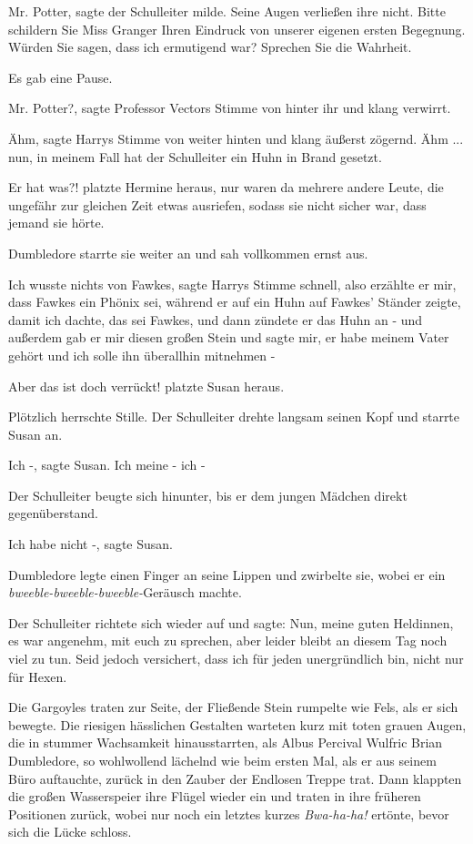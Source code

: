 \glqq{}Mr. Potter\grqq{}, sagte der Schulleiter milde. Seine Augen verließen ihre
nicht. \glqq{}Bitte schildern Sie Miss Granger Ihren Eindruck von unserer eigenen
ersten Begegnung. Würden Sie sagen, dass ich ermutigend war? Sprechen Sie die
Wahrheit.\grqq{}

Es gab eine Pause.

\glqq{}Mr. Potter?\grqq{}, sagte Professor Vectors Stimme von hinter ihr und
klang verwirrt.

\glqq{}Ähm\grqq{}, sagte Harrys Stimme von weiter hinten und klang äußerst
zögernd. \glqq{}Ähm ... nun, in meinem Fall hat der Schulleiter ein Huhn in Brand
gesetzt.\grqq{}

\glqq{}Er hat was?!\grqq{} platzte Hermine heraus, nur waren da mehrere andere
Leute, die ungefähr zur gleichen Zeit etwas ausriefen, sodass sie nicht sicher
war, dass jemand sie hörte.

Dumbledore starrte sie weiter an und sah vollkommen ernst aus.

\glqq{}Ich wusste nichts von Fawkes\grqq{}, sagte Harrys Stimme schnell, \glqq{}
also erzählte er mir, dass Fawkes ein Phönix sei, während er auf ein Huhn auf
Fawkes' Ständer zeigte, damit ich dachte, das sei Fawkes, und dann zündete er
das Huhn an - und außerdem gab er mir diesen großen Stein und sagte mir, er habe
meinem Vater gehört und ich solle ihn überallhin mitnehmen -\grqq{}

\glqq{}Aber das ist doch verrückt!\grqq{} platzte Susan heraus.

Plötzlich herrschte Stille. Der Schulleiter drehte langsam seinen Kopf und
starrte Susan an.

\glqq{}Ich -\grqq{}, sagte Susan. \glqq{}Ich meine - ich -\grqq{}

Der Schulleiter beugte sich hinunter, bis er dem jungen Mädchen direkt
gegenüberstand.

\glqq{}Ich habe nicht -\grqq{}, sagte Susan.

Dumbledore legte einen Finger an seine Lippen und zwirbelte sie, wobei er ein
\emph{bweeble-bweeble-bweeble-}Geräusch machte.

Der Schulleiter richtete sich wieder auf und sagte: \glqq{}Nun, meine guten
Heldinnen, es war angenehm, mit euch zu sprechen, aber leider bleibt an diesem
Tag noch viel zu tun. Seid jedoch versichert, dass ich für jeden unergründlich
bin, nicht nur für Hexen.\grqq{}

Die Gargoyles traten zur Seite, der Fließende Stein rumpelte wie Fels, als er
sich bewegte. Die riesigen hässlichen Gestalten warteten kurz mit toten grauen
Augen, die in stummer Wachsamkeit hinausstarrten, als Albus Percival Wulfric
Brian Dumbledore, so wohlwollend lächelnd wie beim ersten Mal, als er aus seinem
Büro auftauchte, zurück in den Zauber der Endlosen Treppe trat. Dann klappten
die großen Wasserspeier ihre Flügel wieder ein und traten in ihre früheren
Positionen zurück, wobei nur noch ein letztes kurzes \glqq{}
\emph{Bwa-ha-ha!}\grqq{} ertönte, bevor sich die Lücke schloss.

